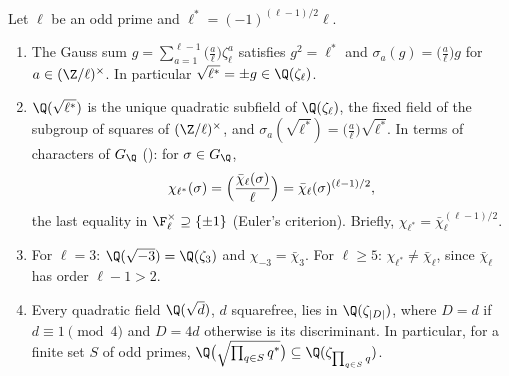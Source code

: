 \begin{proposition}\label{prop:galois:sqrt-lstar}
Let $\ell$ be an odd prime and $\ell^*=(-1)^{(\ell-1)/2}\ell$.
\begin{enumerate}[label=(\alph*)]
\item The Gauss sum $g=\sum_{a=1}^{\ell-1}\bigl(\frac a\ell\bigr)\zeta_\ell^a$ satisfies $g^2=\ell^*$ and $\sigma_a(g)=\bigl(\frac a\ell\bigr)g$ for $a\in(\Z/\ell)^\times$.
In particular $\sqrt{\ell^*}=\pm g\in\Q(\zeta_\ell)$.
\item $\Q(\sqrt{\ell^*})$ is the unique quadratic subfield of $\Q(\zeta_\ell)$, the fixed field of the subgroup of squares of $(\Z/\ell)^\times$, and
$\sigma_a(\sqrt{\ell^*})=\bigl(\frac a\ell\bigr)\sqrt{\ell^*}$. In terms of characters of $G_\Q$ (): for $\sigma\in G_\Q$,
\[
\chi_{\ell^*}(\sigma)=\Bigl(\frac{\bar\chi_\ell(\sigma)}{\ell}\Bigr)=\bar\chi_\ell(\sigma)^{(\ell-1)/2},
\]
the last equality in $\F_\ell^\times\supseteq\{\pm1\}$ (Euler's criterion). Briefly, $\chi_{\ell^*}=\bar\chi_\ell^{(\ell-1)/2}$.
\item For $\ell=3$: $\Q(\sqrt{-3})=\Q(\zeta_3)$ and $\chi_{-3}=\bar\chi_3$. For $\ell\ge5$: $\chi_{\ell^*}\ne\bar\chi_\ell$, since $\bar\chi_\ell$ has order $\ell-1>2$.
\item Every quadratic field $\Q(\sqrt d)$, $d$ squarefree, lies in $\Q(\zeta_{|D|})$, where $D=d$ if $d\equiv1\pmod4$ and $D=4d$ otherwise is its discriminant.
In particular, for a finite set $S$ of odd primes, $\Q\bigl(\sqrt{\textstyle\prod_{q\in S}q^*}\bigr)\subseteq\Q(\zeta_{\prod_{q\in S}q})$.
\end{enumerate}
\end{proposition}

